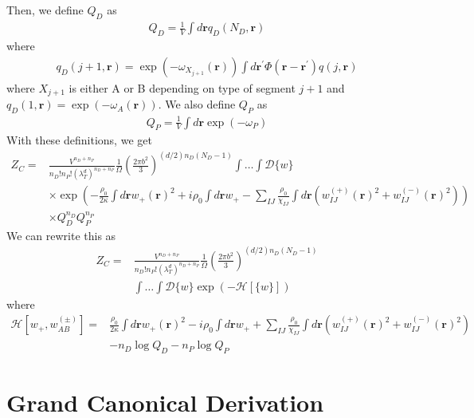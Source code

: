 \documentclass{article}
\begin{document}
Then, we define $Q_D$ as
\begin{align*}
  Q_D = \frac{1}{V} \int d\mathbf{r} q_D (N_D, \mathbf{r})
\end{align*}
where
\begin{align*}
  q_D(j+1, \mathbf{r}) = \exp(-\omega_{X_{j+1}}(\mathbf{r}))
    \int d \mathbf{r}^\prime \Phi(\mathbf{r} - \mathbf{r}^\prime)
    q(j, \mathbf{r})
\end{align*}
where $X_{j+1}$ is either A or B depending on type of segment $j+1$
  and $q_D(1, \mathbf{r}) = \exp(-\omega_A(\mathbf{r}))$.
We also define $Q_P$ as
\begin{align*}
  Q_P = \frac{1}{V} \int d\mathbf{r} \exp (-\omega_P)
\end{align*}
With these definitions, we get
\begin{align*}
  Z_C =& \frac{V^{n_D+n_P}}
              {n_D!n_P! \left( \lambda_T^d \right)^{n_D+n_P}}
    \frac{1}{\Omega}
    \left( \frac{2\pi b^2}{3} \right)
      ^{(d/2)n_D(N_D-1)}
    \int \hdots \int \mathcal{D} \{w\} \\
    &\times \exp \left(
      - \frac{\rho_0}{2\kappa} \int d \mathbf{r} w_+(\mathbf{r})^2
      + i \rho_0 \int d\mathbf{r} w_+
      - \sum_{IJ}
      \frac{\rho_0}{\chi_{IJ}}
      \int d \mathbf{r}
      \left(
        w_{IJ}^{(+)} (\mathbf{r})^2 + w_{IJ}^{(-)} (\mathbf{r})^2
      \right)
    \right) \\
    &\times Q_D^{n_D} Q_P^{n_P}
\end{align*}
We can rewrite this as
\begin{align*}
  Z_C =& \frac{V^{n_D+n_P}}
              {n_D!n_P! \left( \lambda_T^d \right)^{n_D+n_P}}
    \frac{1}{\Omega}
    \left( \frac{2\pi b^2}{3} \right)
      ^{(d/2)n_D(N_D-1)} \\
    &\int \hdots \int \mathcal{D} \{w\}
    \exp \left(
      -\mathcal{H}[\{w\}]
    \right)
\end{align*}
where
\begin{align*}
  \mathcal{H}[w_+, w_{AB}^{(\pm)}] =&
    \frac{\rho_0}{2\kappa} \int d \mathbf{r} w_+(\mathbf{r})^2
    - i \rho_0 \int d\mathbf{r} w_+
    + \sum_{IJ}
    \frac{\rho_0}{\chi_{IJ}}
    \int d \mathbf{r}
    \left(
      w_{IJ}^{(+)} (\mathbf{r})^2 + w_{IJ}^{(-)} (\mathbf{r})^2
    \right) \\
    &- n_D \log Q_D - n_P \log Q_P
\end{align*}

\section{Grand Canonical Derivation}
\end{document}
